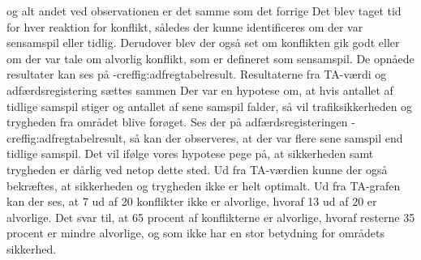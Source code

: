 og alt andet ved observationen er det samme som det forrige %
Det blev taget tid for hver reaktion for konflikt, således der kunne identificeres om der var sensamspil eller tidlig. Derudover blev der også set om konflikten gik godt eller om der var tale om alvorlig konflikt, som er defineret som sensamspil. De opnåede resultater kan ses på -cref{fig:adfregtabelresult}.
Resultaterne fra TA-værdi og adfærdsregistering sættes sammen
Der var en hypotese om, at hvis antallet af tidlige samspil stiger og antallet af sene samspil falder, så vil trafiksikkerheden og trygheden fra området blive forøget. Ses der på adfærdsregisteringen -cref{fig:adfregtabelresult}, så kan der observeres, at der var flere sene samspil end tidlige samspil. Det vil ifølge vores hypotese pege på, at sikkerheden samt trygheden er dårlig ved netop dette sted. Ud fra TA-værdien kunne der også bekræftes, at sikkerheden og trygheden ikke er helt optimalt.
Ud fra TA-grafen kan der ses, at 7 ud af 20 konflikter ikke er alvorlige, hvoraf 13 ud af 20 er alvorlige. Det svar til, at 65 procent af konflikterne er alvorlige, hvoraf resterne 35 procent er mindre alvorlige, og som ikke har en stor betydning for områdets sikkerhed.
